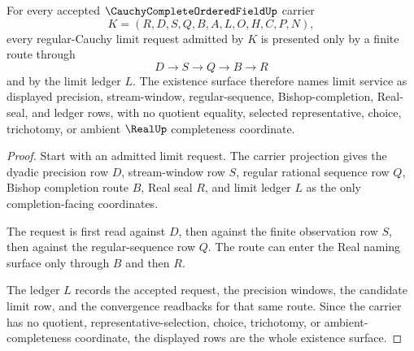 \begin{theorem}
\label{thm:cauchy-complete-ordered-field-regular-cauchy-existence}
For every accepted $\CauchyCompleteOrderedFieldUp$ carrier
$$
K=(R,D,S,Q,B,A,L,O,H,C,P,N),
$$
every regular-Cauchy limit request admitted by $K$ is presented only by a finite route through
$$
D \longrightarrow S \longrightarrow Q \longrightarrow B \longrightarrow R
$$
and by the limit ledger $L$. The existence surface therefore names limit service as displayed precision, stream-window, regular-sequence, Bishop-completion, Real-seal, and ledger rows, with no quotient equality, selected representative, choice, trichotomy, or ambient $\RealUp$ completeness coordinate.
\end{theorem}
\begin{proof}
Start with an admitted limit request. The carrier projection gives the dyadic precision row $D$, stream-window row $S$, regular rational sequence row $Q$, Bishop completion route $B$, Real seal $R$, and limit ledger $L$ as the only completion-facing coordinates.

The request is first read against $D$, then against the finite observation row $S$, then against the regular-sequence row $Q$. The route can enter the Real naming surface only through $B$ and then $R$.

The ledger $L$ records the accepted request, the precision windows, the candidate limit row, and the convergence readbacks for that same route. Since the carrier has no quotient, representative-selection, choice, trichotomy, or ambient-completeness coordinate, the displayed rows are the whole existence surface.
\end{proof}

